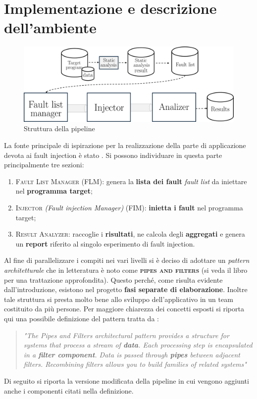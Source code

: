\section{Implementazione e descrizione dell'ambiente}\label{sec:Fault_Env}

\begin{figure}[h]
    \centering
    \includegraphics[scale=0.5]{img/pipeline.png}
    \caption{Struttura della pipeline}
\end{figure}

La fonte principale di ispirazione per la realizzazione della parte di applicazione devota ai fault injection è stato \cite{benso_fault_1998}.
Si possono individuare in questa parte principalmente tre sezioni: 
\begin{enumerate}
    \itemsep-0.3em
    \item \textsc{Fault List Manager} (FLM): genera la \textbf{lista dei fault} \textit{fault list} da iniettare nel \textbf{programma target}; 
    \item \textsc{Injector} \textit{(Fault injection Manager)} (FIM): \textbf{inietta i fault} nel programma target; 
    \item \textsc{Result Analyzer}: raccoglie i \textbf{risultati}, ne calcola degli \textbf{aggregati} e genera un \textbf{report} riferito al singolo esperimento di fault injection.
\end{enumerate}

Al fine di parallelizzare i compiti nei vari livelli si è deciso di adottare un \textit{pattern architetturale} che in letteratura è noto come \textbf{\textsc{pipes and filters}} (si veda il libro \cite{schmidt2013pattern} per una trattazione approfondita). Questo perché, come risulta evidente dall'introduzione, esistono nel progetto \textbf{fasi separate di elaborazione}. Inoltre tale struttura si presta molto bene allo sviluppo dell'applicativo in un team costituito da più persone. Per maggiore chiarezza dei concetti esposti si riporta qui una possibile definizione del pattern tratta da \cite{schmidt2013pattern}: 
\begin{quotation}
    \textit{
        \noindent
"The Pipes and Filters architectural pattern provides a structure for
systems that process a stream of \textbf{data}. Each processing step is
encapsulated in a \textbf{filter component}. Data is passed through \textbf{pipes}
between adjacent filters. Recombining filters allows you to build
families of related systems"}
\end{quotation}
Di seguito si riporta 
la versione modificata della pipeline in cui vengono aggiunti anche i componenti citati nella definizione. 

